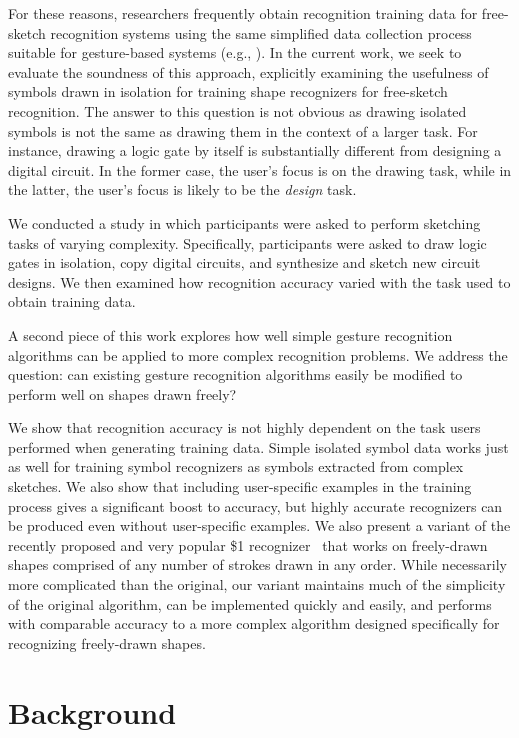 \documentclass[final,5p,twocolumn]{elsarticle}
\begin{document}
For these reasons, researchers frequently obtain recognition training
data for free-sketch recognition systems using the same simplified
data collection process suitable for gesture-based systems (e.g.,
\cite{Kara2005ImageBased,Hse2004ssr}). In the current work, we seek to
evaluate the soundness of this approach, explicitly examining the usefulness
of symbols drawn in isolation for training shape recognizers for
free-sketch recognition.  The answer to this question is not obvious
as drawing isolated symbols is not the same as drawing them in the
context of a larger task. For instance, drawing a logic gate by itself
is substantially different from designing a digital circuit.  In the
former case, the user's focus is on the drawing task, while in the
latter, the user's focus is likely to be the \textit{design} task.

We conducted a study in which participants
were asked to perform sketching tasks of varying
complexity. Specifically, participants were asked to draw logic gates
in isolation, copy digital circuits, and synthesize and sketch new
circuit designs.  We then examined how recognition accuracy varied
with the task used to obtain training data.

A second piece of this work explores how well simple gesture recognition 
algorithms can be applied to more complex recognition problems.  
We address the question: can existing gesture recognition algorithms easily 
be modified to perform well on shapes drawn freely? 

We show that recognition accuracy is not highly dependent on the task
users performed when generating training data.  Simple isolated symbol
data works just as well for training symbol recognizers as symbols
extracted from complex sketches. We also show that including
user-specific examples in the training process gives a significant
boost to accuracy, but highly accurate recognizers
can be produced even without user-specific examples.  We also present a variant of
the recently proposed and very popular \$1 recognizer~\cite{dollar}
that works on freely-drawn shapes comprised of any number of strokes
drawn in any order.  While necessarily more complicated than the
original, our variant maintains much of the simplicity of the original
algorithm, can be implemented quickly and easily, and performs with
comparable accuracy to a more complex algorithm designed specifically
for recognizing freely-drawn shapes.

\section{Background}
\end{document}
